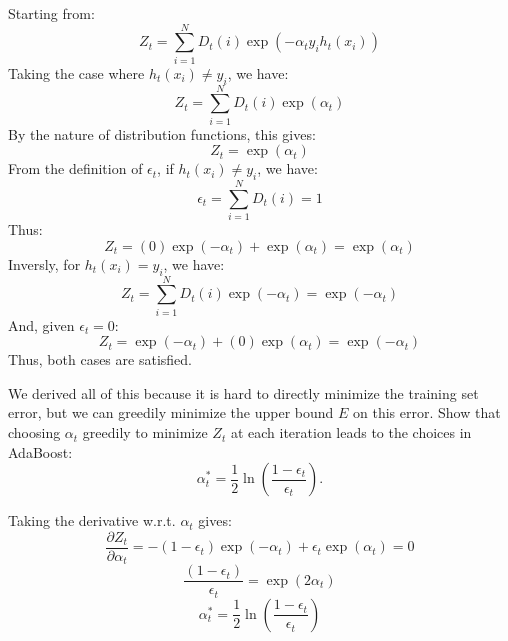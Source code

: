 \begin{solution}
	Starting from:
    \begin{equation}
        Z_t = \sum\limits_{i=1}^N D_t(i) \exp(-\alpha_{t}y_{i}h_{t}(x_{i}))
    \end{equation}
    Taking the case where $h_t(x_i)\neq y_i$, we have:
    \begin{equation}
        Z_t = \sum\limits_{i=1}^N D_t(i) \exp(\alpha_{t})
    \end{equation}
    By the nature of distribution functions, this gives:
    \begin{equation}
        Z_t = \exp(\alpha_{t})
    \end{equation}
    From the definition of $\epsilon_t$, if $h_t(x_i)\neq y_i$, we have:
    \begin{equation}
        \epsilon_t = \sum\limits_{i=1}^N D_t(i) = 1
    \end{equation}
    Thus:
    \begin{equation}
        Z_t = (0)\exp(-\alpha_t)+\exp(\alpha_t)=\exp(\alpha_t)
    \end{equation}
    Inversly, for $h_t(x_i)= y_i$, we have:
    \begin{equation}
        Z_t = \sum\limits_{i=1}^N D_t(i) \exp(-\alpha_{t})=\exp(-\alpha_{t})
    \end{equation}
    And, given $\epsilon_t=0$:
    \begin{equation}
        Z_t = \exp(-\alpha_t)+(0)\exp(\alpha_t)=\exp(-\alpha_t)
    \end{equation}
    Thus, both cases are satisfied.
\end{solution}

\problem[2]
We derived all of this because it is hard to directly minimize the training set error, but we can greedily minimize the upper bound $E$ on this error. Show that choosing $\alpha_t$
greedily to minimize $Z_t$ at each iteration leads to the choices in
AdaBoost:
$$\alpha_{t}^* = \frac{1}{2} \ln \left(\frac{1 - \epsilon_t}{\epsilon_t} \right).$$

\begin{solution}
	Taking the derivative w.r.t. $\alpha_t$ gives:
    \begin{equation}
        \frac{\partial Z_t}{\partial\alpha_t} = -(1-\epsilon_t)\exp(-\alpha_t)+\epsilon_t\exp(\alpha_t) = 0
    \end{equation}
    \begin{equation}
        \frac{(1-\epsilon_t)}{\epsilon_t} = \exp(2\alpha_t)
    \end{equation}
    \begin{equation}
        \alpha_t^* = \frac{1}{2}\ln \left(\frac{1 - \epsilon_t}{\epsilon_t} \right)
    \end{equation}
\end{solution}

